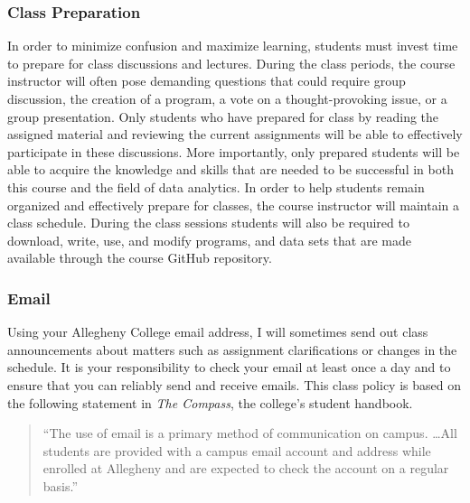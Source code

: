 \documentclass[11pt]{article} %
\begin{document}
\subsubsection*{\textbf{Class Preparation}}

% 

\noindent In order to minimize confusion and maximize learning, students must invest time to prepare for class discussions and lectures.  During the class periods, the course instructor will often pose demanding questions that could require group discussion, the creation of a program, a vote on a thought-provoking issue, or a group presentation.  Only students who have prepared for class by reading the assigned material and reviewing the current assignments will be able to effectively participate in these discussions.  More importantly, only prepared students will be able to acquire the knowledge and skills that are needed to be successful in both this course and the field of data analytics.  In order to help students remain organized and effectively prepare for classes, the course instructor will maintain a class schedule. During the class sessions students will also be required to download, write, use, and modify programs, and data sets that are made available through the course GitHub repository.


\subsubsection*{\textbf{Email}}

Using your Allegheny College email address, I will sometimes send out class announcements about matters such as assignment clarifications or changes in the schedule. It is your responsibility to check your email at least once a day and to ensure that you can reliably send and receive emails. This class policy is based on the following statement in {\em The Compass}, the college's student handbook.

\vspace*{-.1in}
\begin{quote}
  ``The use of email is a primary method of communication on campus. \ldots  All students are provided with a campus email account and address while enrolled at Allegheny and are expected to check the account on a regular
  basis.'' 
\end{quote}
\vspace*{-.1in}
\end{document}

